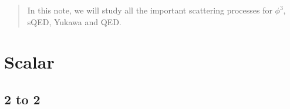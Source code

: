 \documentclass[a4paper]{article}
\begin{document}
  
 
\maketitle

\begin{abstract}
    In this note, we will study all the important scattering processes for $\phi^3$, sQED, Yukawa and QED.
\end{abstract}

\tableofcontents
\newpage 

\section{Scalar}

\subsection{2 to 2}
\end{document}

